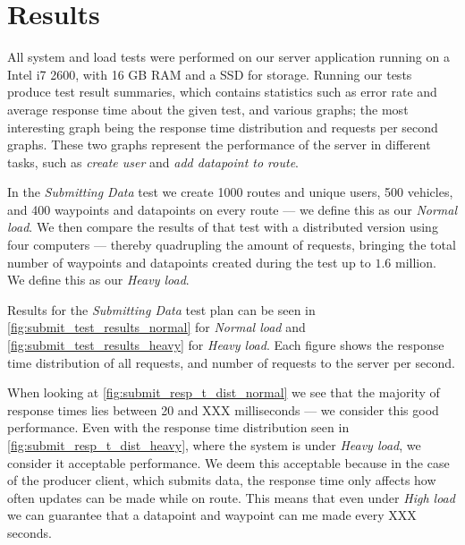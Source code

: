 \section{Results}
All system and load tests were performed on our server application running on a Intel i7 2600, with 16 GB RAM and a SSD for storage.
Running our tests produce test result summaries, which contains statistics such as error rate and average response time about the given test, and various graphs;
the most interesting graph being the response time distribution and requests per second graphs.
These two graphs represent the performance of the server in different tasks, such as \textit{create user} and \textit{add datapoint to route}.

In the \textit{Submitting Data} test we create 1000 routes and unique users, 500 vehicles, and 400 waypoints and datapoints on every route --- we define this as our \textit{Normal load}.
We then compare the results of that test with a distributed version using four computers --- thereby quadrupling the amount of requests, bringing the total number of waypoints and datapoints created during the test up to $1.6$ million.
We define this as our \textit{Heavy load}.

\bigskip
Results for the \textit{Submitting Data} test plan can be seen in \cref{fig:submit_test_results_normal} for \textit{Normal load} and \cref{fig:submit_test_results_heavy} for \textit{Heavy load}.
Each figure shows the response time distribution of all requests, and number of requests to the server per second.

When looking at \cref{fig:submit_resp_t_dist_normal} we see that the majority of response times lies between 20 and XXX milliseconds --- we consider this good performance.
Even with the response time distribution seen in \cref{fig:submit_resp_t_dist_heavy}, where the system is under \textit{Heavy load}, we consider it acceptable performance.
We deem this acceptable because in the case of the producer client, which submits data, the response time only affects how often updates can be made while on route.
This means that even under \textit{High load} we can guarantee that a datapoint and waypoint can me made every XXX seconds.

